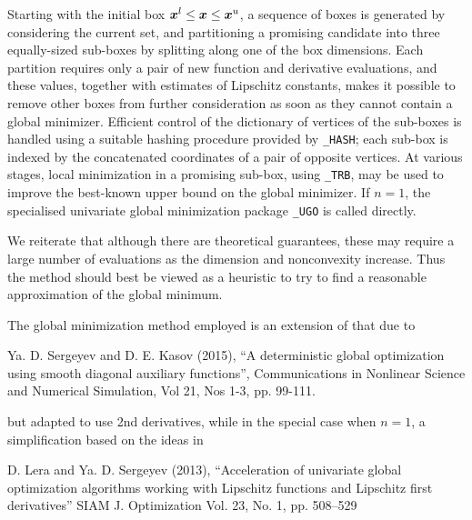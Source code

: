 \documentclass{galahad}
\begin{document}

\galmethod

Starting with the initial box ${\bm{x}}^l \leq {\bm{x}} \leq {\bm{x}}^u$, a sequence of 
boxes is generated by considering the current set, and partitioning
a promising candidate into three equally-sized sub-boxes by splitting 
along one of the box dimensions. Each partition requires only a pair of 
new function and derivative evaluations, and these values, together with 
estimates of Lipschitz constants, makes it possible to remove other boxes 
from further consideration as soon as they cannot contain a global minimizer. 
Efficient control of the dictionary of vertices of the sub-boxes
is handled using a suitable hashing procedure provided by 
{\tt \libraryname\_HASH}; each sub-box is indexed by the concatenated 
coordinates of a pair of opposite vertices. At various
stages, local minimization in a promising sub-box, using 
{\tt \libraryname\_TRB}, may be used to improve the best-known upper bound 
on the global minimizer.
If $n=1$, the specialised univariate global minimization package 
{\tt \libraryname\_UGO} is called directly.

We reiterate that although there are theoretical guarantees, 
these may require a large number of evaluations as the dimension 
and nonconvexity increase.
Thus the method should best be viewed as a heuristic to try to find
a reasonable approximation of the global minimum.

\galreferences
\vspace*{1mm}

\noindent
The global minimization method employed is an extension of that due to
\vspace*{1mm}

\noindent
Ya. D. Sergeyev and D. E. Kasov (2015),
``A deterministic global optimization using smooth diagonal 
auxiliary functions'',
Communications in Nonlinear Science and Numerical Simulation,
Vol 21, Nos 1-3, pp. 99-111.
\vspace*{1mm}

\noindent
but adapted to use 2nd derivatives, while in the special case when $n=1$,
a simplification based on the ideas in
\vspace*{1mm}

\noindent
D. Lera and Ya. D. Sergeyev (2013),
``Acceleration of univariate global optimization algorithms working with
Lipschitz functions and Lipschitz first derivatives''
SIAM J. Optimization Vol. 23, No. 1, pp. 508–529
\vspace*{1mm}
\end{document}
